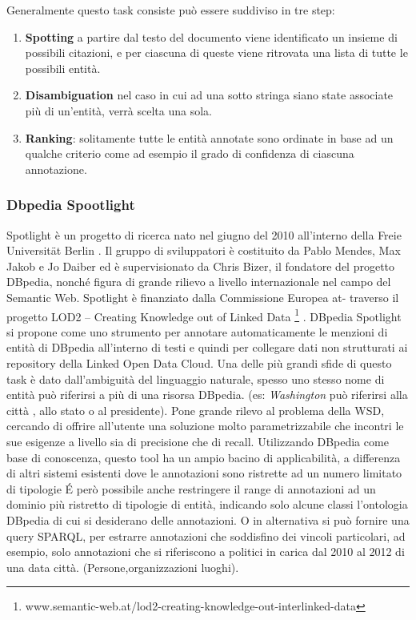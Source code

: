 Generalmente questo task consiste può essere suddiviso in tre step:
\begin{enumerate}
\item \textbf{Spotting} a partire dal testo del documento viene identificato un insieme di possibili citazioni, e per ciascuna di queste viene ritrovata una lista di tutte le possibili entità.
\item \textbf{Disambiguation} nel caso in cui ad una sotto stringa siano state associate più di un'entità, verrà scelta una sola.
\item \textbf{Ranking}: solitamente tutte  le entità annotate sono ordinate in base ad un qualche criterio come ad esempio il grado di confidenza di ciascuna annotazione.
\end{enumerate}

\subsubsection{Dbpedia Spootlight}
Spotlight è un progetto di ricerca nato nel giugno del 2010 all'interno della Freie Universität Berlin . Il gruppo di sviluppatori è costituito da Pablo Mendes, Max Jakob e Jo Daiber ed è supervisionato da Chris Bizer, il fondatore del progetto DBpedia, nonché figura di grande rilievo a livello internazionale nel campo del Semantic Web. Spotlight è finanziato dalla Commissione Europea at-
traverso il progetto LOD2 – Creating Knowledge out of Linked Data \footnote{www.semantic-web.at/lod2-creating-knowledge-out-interlinked-data} .
DBpedia Spotlight \cite{isem2013daiber}  si propone come uno strumento per annotare automaticamente le
menzioni di entità di DBpedia all'interno di testi e quindi per collegare dati non strutturati ai repository della Linked Open Data Cloud.
Una delle più grandi sfide di questo task è dato dall'ambiguità del linguaggio naturale, spesso uno stesso nome di entità può riferirsi a più di una risorsa DBpedia. (es: \emph{Washington} può riferirsi alla città  , allo stato o al presidente).
Pone grande rilevo al problema della WSD, cercando di offrire all'utente una soluzione molto parametrizzabile che incontri le sue esigenze a livello sia di precisione che di recall.
Utilizzando DBpedia come base di conoscenza, questo tool ha un ampio bacino di applicabilità, a differenza di altri sistemi esistenti dove le annotazioni sono ristrette ad un numero  limitato di tipologie \'E però possibile anche restringere il range di annotazioni ad
 un dominio più ristretto di tipologie di entità, indicando solo alcune classi  l'ontologia DBpedia di cui si desiderano delle annotazioni. O in alternativa si può fornire una query SPARQL, per estrarre annotazioni che soddisfino dei vincoli particolari, ad esempio, solo annotazioni che si riferiscono a politici in carica dal 2010 al 2012 di una data città.  (Persone,organizzazioni luoghi).
 


